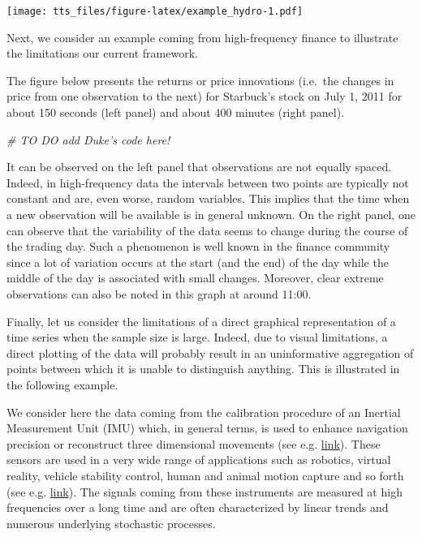 \documentclass[]{book}
\newenvironment{Shaded}{\begin{snugshade}}{\end{snugshade}}
\newcommand{\CommentTok}[1]{\textcolor[rgb]{0.56,0.35,0.01}{\textit{#1}}}
\theoremstyle{definition}
\theoremstyle{definition}
\theoremstyle{definition}
\theoremstyle{remark}
\let\BeginKnitrBlock\begin \let\EndKnitrBlock\end
\begin{document}
\texttt{[image: tts\_files/figure-latex/example\_hydro-1.pdf]}

Next, we consider an example coming from high-frequency finance to
illustrate the limitations our current framework.

\BeginKnitrBlock{example}
\protect\hypertarget{exm:stocks-starbucks}{}{\label{exm:stocks-starbucks}
}The figure below presents the returns or price innovations (i.e.~the
changes in price from one observation to the next) for Starbuck's stock
on July 1, 2011 for about 150 seconds (left panel) and about 400 minutes
(right panel).
\EndKnitrBlock{example}

\begin{Shaded}
\begin{Highlighting}[]
\CommentTok{# TO DO add Duke's code here!}
\end{Highlighting}
\end{Shaded}

It can be observed on the left panel that observations are not equally
spaced. Indeed, in high-frequency data the intervals between two points
are typically not constant and are, even worse, random variables. This
implies that the time when a new observation will be available is in
general unknown. On the right panel, one can observe that the
variability of the data seems to change during the course of the trading
day. Such a phenomenon is well known in the finance community since a
lot of variation occurs at the start (and the end) of the day while the
middle of the day is associated with small changes. Moreover, clear
extreme observations can also be noted in this graph at around 11:00.

Finally, let us consider the limitations of a direct graphical
representation of a time series when the sample size is large. Indeed,
due to visual limitations, a direct plotting of the data will probably
result in an uninformative aggregation of points between which it is
unable to distinguish anything. This is illustrated in the following
example.

\BeginKnitrBlock{example}
\protect\hypertarget{exm:large-imu}{}{\label{exm:large-imu} }We consider
here the data coming from the calibration procedure of an Inertial
Measurement Unit (IMU) which, in general terms, is used to enhance
navigation precision or reconstruct three dimensional movements (see
e.g. \href{https://www.youtube.com/watch?v=htoBvSq8jLA}{link}). These
sensors are used in a very wide range of applications such as robotics,
virtual reality, vehicle stability control, human and animal motion
capture and so forth (see e.g.
\href{https://www.youtube.com/watch?v=g4tgtPA54_Y}{link}). The signals
coming from these instruments are measured at high frequencies over a
long time and are often characterized by linear trends and numerous
underlying stochastic processes.
\EndKnitrBlock{example}
\end{document}
